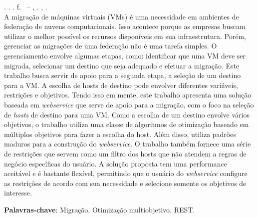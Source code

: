 \begin{resumo}[RESUMO]
\begin{SingleSpacing}

\imprimirautorcitacao. \imprimirtitulo. \imprimirdata. \pageref {LastPage} f. \imprimirprojeto\ – \imprimirprograma, \imprimirinstituicao. \imprimirlocal, \imprimirdata.\\

A migração de máquinas virtuais (VMs) é uma necessidade em ambientes 
de federação de nuvens computacionais. Isso acontece porque as empresas
buscam utilizar o melhor possível os recursos disponíveis em sua infraestrutura.
Porém, gerenciar as migrações de uma federação não é uma tarefa simples. O gerenciamento
envolve algumas etapas, como: identificar que uma VM deve ser migrada, selecionar um
destino que seja adequado e efetuar a migração. Este trabalho busca servir de apoio 
para a segunda etapa, a seleção de um destino para a VM. A escolha de hosts de destino pode envolver
diferentes variáveis, restrições e objetivos. Tendo isso em mente, este trabalho apresenta uma solução
baseada em \textit{webservice} que serve de apoio para a migração, com o foco na seleção 
de \textit{hosts} de destino para uma VM. Como a escolha de um destino envolve 
vários objetivos, o trabalho utiliza uma classe de algoritmos de otimização baseado em 
múltiplos objetivos para fazer a escolha do host. Além disso, utiliza padrões maduros para 
a construção do \textit{webservice}. O trabalho também fornece uma série de restrições
que servem como um filtro dos hosts que não atendem a regras de negócio específicas do usuário. 
A solução proposta tem uma performance aceitável e é bastante flexível, permitindo que o 
usuário do \textit{webservice} configure as restrições de acordo com sua necessidade e 
selecione somente os objetivos de interesse.

\textbf{Palavras-chave}: Migração. Otimização multiobjetivo. REST.

\end{SingleSpacing}
\end{resumo}

